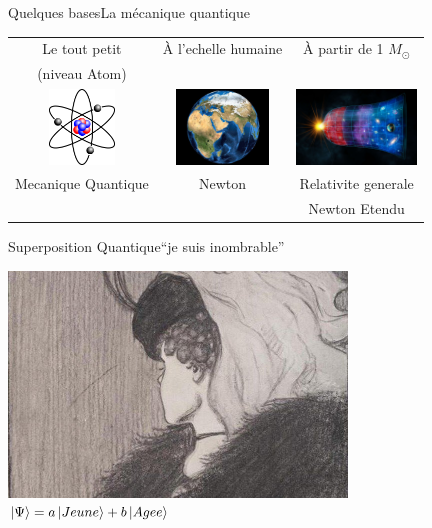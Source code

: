 \documentclass{beamer}
\begin{document}
\begin{frame}{Quelques bases}{La m\'{e}canique quantique}
  \begin{center}
    \begin{tabular}{ c c c }
      Le tout petit & \`{A} l'echelle humaine  & \`{A} partir de 1 \(M_\odot\) \\
      (niveau Atom) & & \\
      \includegraphics[height=2cm]{Atome_lithium_rutherford.png} & \includegraphics[height=2cm]{TerreWorldWind.jpg} & \includegraphics[height=2cm]{04-965413833409_COI.jpeg}\\
      Mecanique Quantique & Newton & Relativite generale \\
       &  & Newton Etendu \\
    \end{tabular}
  \end{center}
\end{frame}

\begin{frame}{Superposition Quantique}{``je suis inombrable''}
  \begin{center}
    \includegraphics[width=9cm]{3604843-inline.jpg}\\
    \vspace{0.5cm}
    $\ket{\Psi} = a \ket{Jeune} + b \ket{Agee}$ 
  \end{center}
\end{frame}
\end{document}
